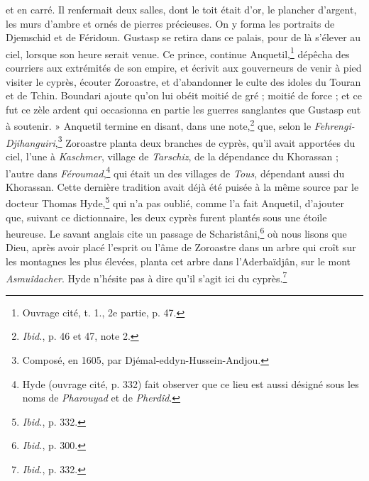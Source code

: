 \documentclass[a4paper, 11pt, oneside, polutonikogreek, french]{article}
\begin{document}
et en carré. Il renfermait deux salles, dont le toit était d'or, le plancher d'argent, les murs d'ambre et ornés de pierres précieuses. On y forma les portraits de Djemschid et de Féridoun. Gustasp se retira dans ce palais, pour de là s'élever au ciel, lorsque son heure serait venue. Ce prince, continue Anquetil,\footnote{Ouvrage cité, t. 1., 2e partie, p. 47.} dépêcha des courriers aux extrémités de son empire, et écrivit aux gouverneurs de venir à pied visiter le cyprès, écouter Zoroastre, et d'abandonner le culte des idoles du Touran et de Tchin. Boundari ajoute qu'on lui obéit moitié de gré ; moitié de force ; et ce fut ce zèle ardent qui occasionna en partie les guerres sanglantes que Gustasp eut à soutenir. » Anquetil termine en disant, dans une note,\footnote{\emph{Ibid.}, p. 46 et 47, note 2.} que, selon le \emph{Fehrengi-Djihanguiri},\footnote{Composé, en 1605, par Djémal-eddyn-Hussein-Andjou.} Zoroastre planta deux branches de cyprès, qu'il avait apportées du ciel, l'une à \emph{Kaschmer}, village de \emph{Tarschiz}, de la dépendance du Khorassan ; l'autre dans \emph{Féroumad},\footnote{Hyde (ouvrage cité, p. 332) fait observer que ce lieu est aussi désigné sous les noms de \emph{Pharouyad} et de \emph{Pherdîd}.} qui était un des villages de \emph{Tous}, dépendant aussi du Khorassan. Cette dernière tradition avait déjà été puisée à la même source par le docteur Thomas Hyde,\footnote{\emph{Ibid.}, p. 332.} qui n'a pas oublié, comme l'a fait Anquetil, d'ajouter que, suivant ce dictionnaire, les deux cyprès furent plantés sous une étoile heureuse. Le savant anglais cite un passage de Scharistâni,\footnote{\emph{Ibid.}, p. 300.} où nous lisons que Dieu, après avoir placé l'esprit ou l'âme de Zoroastre dans un arbre qui croît sur les montagnes les plus élevées, planta cet arbre dans l'Aderbaïdjân, sur le mont \emph{Asmuîdacher}. Hyde n'hésite pas à dire qu'il s'agit ici du cyprès.\footnote{\emph{Ibid.}, p. 332.}
\end{document}
